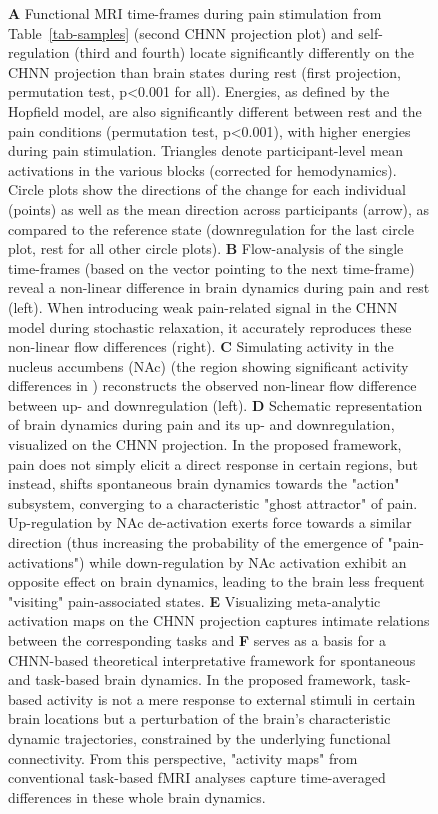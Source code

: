 \documentclass{article}
\begin{document}
\begin{figure}[!htbp]
{\textbf{A} Functional MRI time-frames during pain stimulation from Table~\ref{tab-samples} (second CHNN projection plot)
and self-regulation (third and fourth) locate significantly differently on the CHNN projection than brain states
during rest (first projection, permutation test, p\textless 0.001 for all).  Energies, as defined by the Hopfield model, are also
significantly different between rest and the pain conditions (permutation test, p\textless 0.001), with higher energies during
pain stimulation. Triangles denote participant-level mean activations in the various blocks (corrected for
hemodynamics). Circle plots show the directions of the change for each individual (points) as well as the mean direction
across participants (arrow), as compared to the reference state (downregulation for the last circle plot, rest for all
other circle plots).
\textbf{B} Flow-analysis of the single time-frames (based on the vector pointing to the next time-frame)
reveal a non-linear difference in brain dynamics during pain and rest (left). When introducing weak
pain-related signal in the CHNN model during stochastic relaxation, it accurately reproduces these non-linear flow
differences (right).
\textbf{C} Simulating activity in the nucleus accumbens (NAc) (the region showing significant activity differences in \cite{woo2015distinct}) reconstructs the observed non-linear flow difference between up- and downregulation (left).
\textbf{D} Schematic representation of brain dynamics during pain and its up- and downregulation, visualized on the CHNN
projection. In the proposed framework, pain does not simply elicit a direct response in certain regions, but instead, shifts spontaneous brain dynamics towards the "action" subsystem, converging to a characteristic "ghost
attractor" of pain. Up-regulation by NAc de-activation exerts force towards a similar direction (thus increasing the probability of the emergence of "pain-activations") while down-regulation
by NAc activation exhibit an opposite effect on brain dynamics, leading to the brain less frequent "visiting"
pain-associated states.
\textbf{E} Visualizing meta-analytic activation maps on the CHNN projection captures intimate relations between the corresponding tasks and \textbf{F} serves as a basis for a CHNN-based theoretical interpretative framework for spontaneous and task-based brain dynamics. In the proposed framework, task-based activity is not a mere response to external stimuli in certain brain locations but a perturbation of the brain's characteristic dynamic trajectories, constrained by the underlying functional connectivity. From this perspective, "activity maps" from conventional task-based fMRI analyses capture time-averaged differences in these whole brain dynamics.}
\label{task-validity}
\end{figure}
\end{document}
